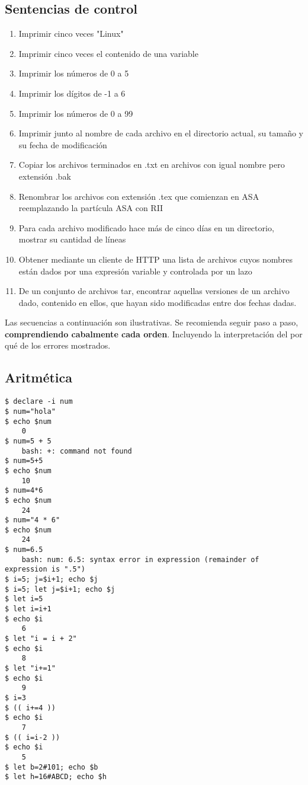 \subsection{Sentencias de control}
\begin{enumerate}
	\item 
Imprimir cinco veces "Linux"
	\item 
Imprimir cinco veces el contenido de una variable
	\item 
Imprimir los números de 0 a 5
	\item 
Imprimir los dígitos de -1 a 6
	\item 
Imprimir los números de 0 a 99
	\item 
Imprimir junto al nombre de cada archivo en el directorio actual, su tamaño y su fecha de modificación
	\item 
Copiar los archivos terminados en .txt en archivos con igual nombre pero extensión .bak
	\item 
Renombrar los archivos con extensión .tex que comienzan en ASA reemplazando la partícula ASA con RII
	\item 
Para cada archivo modificado hace más de cinco días en un directorio, mostrar su cantidad de líneas
	\item 
Obtener mediante un cliente de HTTP una lista de archivos cuyos nombres están dados por  una expresión variable y controlada por un lazo
	\item 
De un conjunto de archivos tar, encontrar aquellas versiones de un archivo dado, contenido en ellos, que hayan sido modificadas entre dos fechas dadas.
\end{enumerate}

Las secuencias a continuación son ilustrativas. Se recomienda seguir paso a paso, {\bf comprendiendo cabalmente cada orden}. Incluyendo la interpretación del por qué de los errores mostrados. 

\subsection{Aritmética}
\begin{lstlisting}
$ declare -i num
$ num="hola"
$ echo $num
	0
$ num=5 + 5
	bash: +: command not found
$ num=5+5
$ echo $num
	10
$ num=4*6
$ echo $num
	24
$ num="4 * 6"
$ echo $num
	24
$ num=6.5
	bash: num: 6.5: syntax error in expression (remainder of expression is ".5")
$ i=5; j=$i+1; echo $j
$ i=5; let j=$i+1; echo $j
$ let i=5
$ let i=i+1
$ echo $i
	6
$ let "i = i + 2"
$ echo $i
	8
$ let "i+=1"
$ echo $i
	9
$ i=3
$ (( i+=4 ))
$ echo $i
	7
$ (( i=i-2 ))
$ echo $i
	5
$ let b=2#101; echo $b
$ let h=16#ABCD; echo $h
\end{lstlisting}

